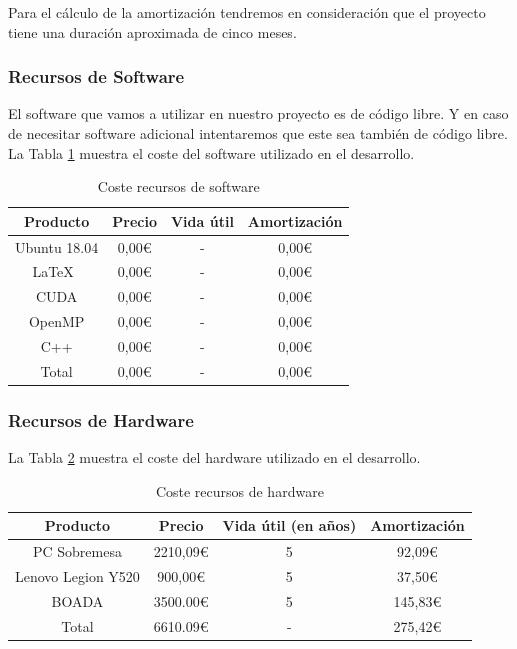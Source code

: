 \documentclass[titlepage,12pt]{report}
\begin{document}
Para el cálculo de la amortización tendremos en consideración que el proyecto tiene una duración aproximada de cinco meses.

\subsubsection{Recursos de Software}

El software que vamos a utilizar en nuestro proyecto es de código libre. Y en caso de necesitar software adicional intentaremos que este sea también de código libre. La Tabla \ref{soft} muestra el coste del software utilizado en el desarrollo.

\begin{table}[H]
	\centering
	\begin{tabular}{|c|c|c|c|}
		\hline
		\textbf{Producto} & \textbf{Precio} & \textbf{Vida útil} & \textbf{Amortización} \\ \hline \hline
		Ubuntu 18.04 	& 0,00€ & - & 0,00€ \\ \hline
		\LaTeX\ 		& 0,00€ & - & 0,00€ \\ \hline
		CUDA 			& 0,00€ & - & 0,00€ \\ \hline
		OpenMP 			& 0,00€ & - & 0,00€ \\ \hline
		C++ 			& 0,00€ & - & 0,00€ \\ \hline	\hline
		Total 			& 0,00€ & - & 0,00€ \\ \hline
	\end{tabular}
	\caption{Coste recursos de software}
	\label{soft}
\end{table}

\subsubsection{Recursos de Hardware}

La Tabla \ref{hard} muestra el coste del hardware utilizado en el desarrollo.

\begin{table}[H]
	\centering
	\begin{tabular}{|c|c|c|c|}
		\hline
		\textbf{Producto} 	& \textbf{Precio} & \textbf{Vida útil (en años)} & \textbf{Amortización} \\ \hline \hline
		PC Sobremesa 		& 2210,09€ & 5 &  92,09€\\ \hline
		Lenovo Legion Y520 	&  900,00€ & 5 &  37,50€ \\ \hline
		BOADA 				& 3500.00€ & 5 & 145,83€ \\ \hline \hline	
		Total 				& 6610.09€ & - & 275,42€ \\ \hline
	\end{tabular}
	\caption{Coste recursos de hardware}
	\label{hard}
\end{table}
\end{document}
